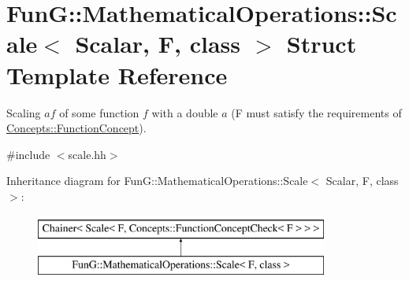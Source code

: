 \hypertarget{structFunG_1_1MathematicalOperations_1_1Scale}{}\section{FunG\+:\+:Mathematical\+Operations\+:\+:Scale$<$ Scalar, F, class $>$ Struct Template Reference}
\label{structFunG_1_1MathematicalOperations_1_1Scale}


Scaling $ af $ of some function $ f $ with a double $ a $ (F must satisfy the requirements of \hyperlink{structFunG_1_1Concepts_1_1FunctionConcept}{Concepts\+::\+Function\+Concept}).  




{\ttfamily \#include $<$scale.\+hh$>$}

Inheritance diagram for FunG\+:\+:Mathematical\+Operations\+:\+:Scale$<$ Scalar, F, class $>$\+:\begin{figure}[H]
\begin{center}
\leavevmode
\includegraphics[height=2.000000cm]{structFunG_1_1MathematicalOperations_1_1Scale}
\end{center}
\end{figure}
